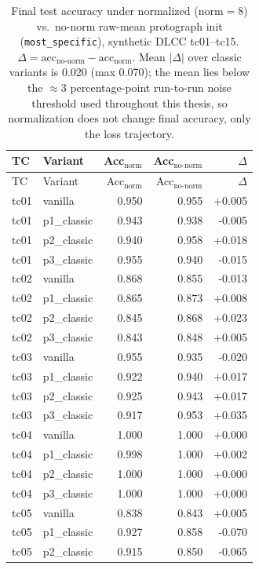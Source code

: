 \begin{longtable}{llrrr}
\caption{Final test accuracy under normalized (norm$=8$) vs.\ no-norm raw-mean protograph init (\texttt{most\_specific}), synthetic DLCC tc01--tc15. $\Delta=\text{acc}_{\text{no-norm}}-\text{acc}_{\text{norm}}$. Mean $|\Delta|$ over classic variants is 0.020 (max 0.070); the mean lies below the ${\approx}3$ percentage-point run-to-run noise threshold used throughout this thesis, so normalization does not change final accuracy, only the loss trajectory.}\label{tab:ms-norm-vs-nonorm-acc}\\
\toprule TC & Variant & Acc$_{\text{norm}}$ & Acc$_{\text{no-norm}}$ & $\Delta$ \\ \midrule \endfirsthead
\toprule TC & Variant & Acc$_{\text{norm}}$ & Acc$_{\text{no-norm}}$ & $\Delta$ \\ \midrule \endhead
tc01 & vanilla & 0.950 & 0.955 & +0.005 \\
tc01 & p1\_classic & 0.943 & 0.938 & -0.005 \\
tc01 & p2\_classic & 0.940 & 0.958 & +0.018 \\
tc01 & p3\_classic & 0.955 & 0.940 & -0.015 \\
tc02 & vanilla & 0.868 & 0.855 & -0.013 \\
tc02 & p1\_classic & 0.865 & 0.873 & +0.008 \\
tc02 & p2\_classic & 0.845 & 0.868 & +0.023 \\
tc02 & p3\_classic & 0.843 & 0.848 & +0.005 \\
tc03 & vanilla & 0.955 & 0.935 & -0.020 \\
tc03 & p1\_classic & 0.922 & 0.940 & +0.017 \\
tc03 & p2\_classic & 0.925 & 0.943 & +0.017 \\
tc03 & p3\_classic & 0.917 & 0.953 & +0.035 \\
tc04 & vanilla & 1.000 & 1.000 & +0.000 \\
tc04 & p1\_classic & 0.998 & 1.000 & +0.002 \\
tc04 & p2\_classic & 1.000 & 1.000 & +0.000 \\
tc04 & p3\_classic & 1.000 & 1.000 & +0.000 \\
tc05 & vanilla & 0.838 & 0.843 & +0.005 \\
tc05 & p1\_classic & 0.927 & 0.858 & -0.070 \\
tc05 & p2\_classic & 0.915 & 0.850 & -0.065 \\

\end{longtable}
